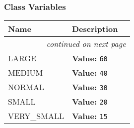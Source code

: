     \label{pygame-asteroids:font:Font}


  \subsubsection{Class Variables}

    \vspace{-1cm}
\hspace{\varindent}\begin{longtable}{|p{\varnamewidth}|p{\vardescrwidth}|l}
\cline{1-2}
\cline{1-2} \centering \textbf{Name} & \centering \textbf{Description}& \\
\cline{1-2}
\endhead\cline{1-2}\multicolumn{3}{r}{\small\textit{continued on next page}}\\\endfoot\cline{1-2}
\endlastfoot\raggedright L\-A\-R\-G\-E\- & \raggedright \textbf{Value:} 
{\tt 60}&\\
\cline{1-2}
\raggedright M\-E\-D\-I\-U\-M\- & \raggedright \textbf{Value:} 
{\tt 40}&\\
\cline{1-2}
\raggedright N\-O\-R\-M\-A\-L\- & \raggedright \textbf{Value:} 
{\tt 30}&\\
\cline{1-2}
\raggedright S\-M\-A\-L\-L\- & \raggedright \textbf{Value:} 
{\tt 20}&\\
\cline{1-2}
\raggedright V\-E\-R\-Y\-\_\-S\-M\-A\-L\-L\- & \raggedright \textbf{Value:} 
{\tt 15}&\\
\cline{1-2}
\end{longtable}

